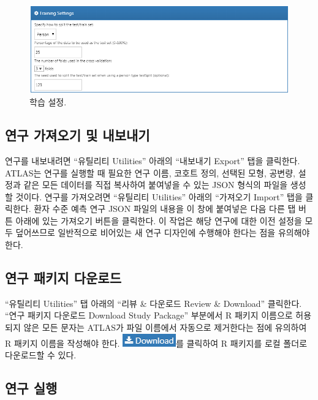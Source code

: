 \documentclass[10.5pt]{book}
\theoremstyle{definition}
\theoremstyle{definition}
\theoremstyle{definition}
\theoremstyle{remark}
\begin{document}
\begin{figure}

{\centering \includegraphics[width=1\linewidth]{images/PatientLevelPrediction/trainingSettings} 

}

\caption{학습 설정.}\label{fig:trainingSettings}
\end{figure}

\subsection{연구 가져오기 및 내보내기}\label{---}

연구를 내보내려면 ``유틸리티 Utilities'' 아래의 ``내보내기 Export'' 탭을
클릭한다. ATLAS는 연구를 실행할 때 필요한 연구 이름, 코호트 정의, 선택된
모형, 공변량, 설정과 같은 모든 데이터를 직접 복사하여 붙여넣을 수 있는
JSON 형식의 파일을 생성할 것이다. 연구를 가져오려면 ``유틸리티
Utilities'' 아래의 ``가져오기 Import'' 탭을 클릭한다. 환자 수준 예측
연구 JSON 파일의 내용을 이 창에 붙여넣은 다음 다른 탭 버튼 아래에 있는
가져오기 버튼을 클릭한다. 이 작업은 해당 연구에 대한 이전 설정을 모두
덮어쓰므로 일반적으로 비어있는 새 연구 디자인에 수행해야 한다는 점을
유의해야 한다.

\subsection{연구 패키지 다운로드}\label{--}

``유틸리티 Utilities'' 탭 아래의 ``리뷰 \& 다운로드 Review \& Download''
클릭한다. ``연구 패키지 다운로드 Download Study Package'' 부분에서 R
패키지 이름으로 허용되지 않은 모든 문자는 ATLAS가 파일 이름에서 자동으로
제거한다는 점에 유의하여 R 패키지 이름을 작성해야 한다.
\includegraphics{images/PatientLevelPrediction/download.png}를 클릭하여
R 패키지를 로컬 폴더로 다운로드할 수 있다.

\subsection{연구 실행}\label{-}
\end{document}
